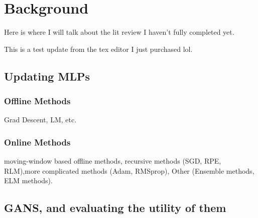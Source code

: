 \chapter{Background}

\par Here is where I will talk about the lit review I haven't fully completed yet.
\par This is a test update from the tex editor I just purchased lol.

\section{Updating MLPs}
\subsection{Offline Methods}
Grad Descent, LM, etc.
\subsection{Online Methods}
moving-window based offline methods, recursive methods (SGD, RPE, RLM),more complicated methods (Adam, RMSprop), Other (Ensemble methods, ELM methods).

\section {GANS, and evaluating the utility of them}
